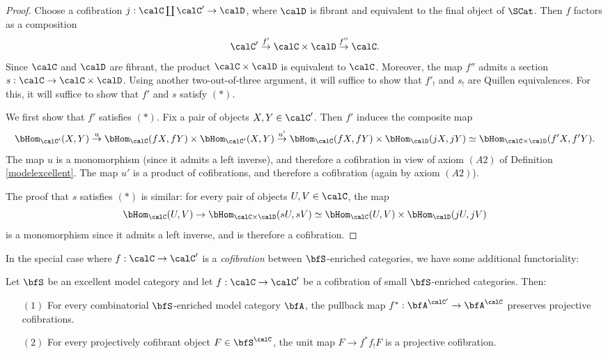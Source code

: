 \begin{proof}
Choose a cofibration $j: \calC \coprod \calC' \rightarrow \calD$, where
$\calD$ is fibrant and equivalent to the final object of $\SCat$. Then $f$ factors as a composition
$$ \calC' \stackrel{f'}{\rightarrow} \calC \times \calD \stackrel{f''}{\rightarrow} \calC.$$
Since $\calC$ and $\calD$ are fibrant, the product $\calC \times \calD$ is equivalent
to $\calC$. Moreover, the map $f''$ admits a section $s: \calC \rightarrow \calC \times \calD$.
Using another two-out-of-three argument, it will suffice to show that $f'_{!}$ and $s_!$ are Quillen equivalences. For this, it will suffice to show that $f'$ and $s$ satisfy $(\ast)$.

We first show that $f'$ satisfies $(\ast)$. Fix a pair of objects $X,Y \in \calC'$.
Then $f'$ induces the composite map
$$ \bHom_{\calC'}(X,Y) \stackrel{u}{\rightarrow} \bHom_{\calC}(fX,fY) \times \bHom_{\calC'}(X,Y)
\stackrel{u'}{\rightarrow} \bHom_{\calC}(fX,fY) \times \bHom_{\calD}(jX,jY) \simeq \bHom_{\calC \times \calD}(f'X, f'Y).$$
The map $u$ is a monomorphism (since it admits a left inverse), and therefore a cofibration
in view of axiom $(A2)$ of Definition \ref{modelexcellent}. 
The map $u'$ is a product of cofibrations, and therefore a cofibration (again by axiom $(A2)$).

The proof that $s$ satisfies $(\ast)$ is similar: for every pair of objects $U,V \in \calC$,
the map $$ \bHom_{\calC}(U,V) \rightarrow \bHom_{ \calC \times \calD}( sU, sV)
\simeq \bHom_{ \calC}( U,V) \times \bHom_{\calD}(jU,jV)$$
is a monomorphism since it admits a left inverse, and is therefore a cofibration.
\end{proof}

In the special case where $f: \calC \rightarrow \calC'$ is a {\em cofibration} between
$\bfS$-enriched categories, we have some additional functoriality:

\begin{proposition}\label{sumner}
Let $\bfS$ be an excellent model category and let $f: \calC \rightarrow \calC'$ be a cofibration
of small $\bfS$-enriched categories. Then:
\begin{itemize}

\item[$(1)$] For every combinatorial $\bfS$-enriched model category $\bfA$, the pullback map
$f^{\ast}: \bfA^{\calC'} \rightarrow \bfA^{\calC}$ preserves projective cofibrations. 

\item[$(2)$] For every projectively cofibrant object $F \in \bfS^{\calC}$, the
unit map $F \rightarrow f^{\ast} f_{!} F$ is a projective cofibration.

\end{itemize}
\end{proposition}


